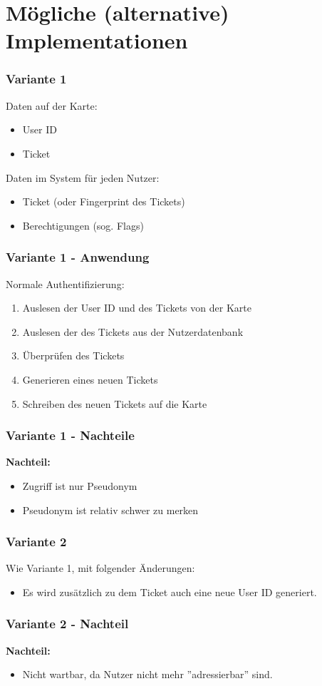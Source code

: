 \section{Mögliche (alternative) Implementationen}
\begin{frame}
	\frametitle{Variante 1}
	Daten auf der Karte:
	\begin{itemize}
		\item<2-> User ID
		\item<3-> Ticket
	\end{itemize}
	Daten im System für jeden Nutzer:
	\begin{itemize}
		\item<4-> Ticket (oder Fingerprint des Tickets)
		\item<5-> Berechtigungen (sog. Flags)
	\end{itemize}
\end{frame}

\begin{frame}
	\frametitle{Variante 1 - Anwendung}
	Normale Authentifizierung:
	\begin{enumerate}
	\item<2-> Auslesen der User ID und des Tickets von der Karte
	\item<3-> Auslesen der des Tickets aus der Nutzerdatenbank
	\item<4-> Überprüfen des Tickets
	\item<5-> Generieren eines neuen Tickets
	\item<6-> Schreiben des neuen Tickets auf die Karte
	\end{enumerate}
\end{frame}

\begin{frame}
	\frametitle{Variante 1 - Nachteile}
	\textbf<2->{Nachteil:}
	\begin{itemize}
		\item<2-> Zugriff ist nur Pseudonym
		\item<3-> Pseudonym ist relativ schwer zu merken
	\end{itemize}
\end{frame}

\begin{frame}
	\frametitle{Variante 2}
	Wie Variante 1, mit folgender Änderungen:
	\begin{itemize}
		\item<2-> Es wird zusätzlich zu dem Ticket auch eine neue User ID generiert.
	\end{itemize}
\end{frame}

\begin{frame}
	\frametitle{Variante 2 - Nachteil}
	\textbf<2->{Nachteil:}
	\begin{itemize}
		\item<2-> Nicht wartbar, da Nutzer nicht mehr ''adressierbar'' sind.
	\end{itemize}
\end{frame}

